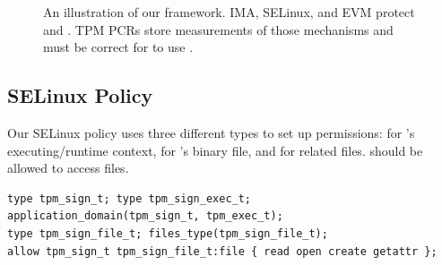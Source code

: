 \documentclass[12pt,letterpaper]{kuthesis}
\newif\ifacm
\begin{document}
\begin{figure}
  \centering
  
  \caption[Illustration of our framework]{An illustration of our framework.
    IMA, SELinux, and EVM protect \tpmsign and \wcp.
    TPM PCRs store measurements of those mechanisms
    and must be correct for \tpmsign to use \wcp.
  }
  \ifacm
    \Description[Illustration of framework.]{
      The image is an illustration of the components of the framework.
      The components are the TPM, its PCRs, and the signing key;
      the kernel security mechanisms: IMA, SELinux, and EVM;
      the wildcard policy; the LUKS container containing the wildcard policy;
      and the tpm_sign program that can access the wildcard policy.
      Green arrows point from IMA and SELinux to tpm_sign, indicating IMA and SELinux protect tpm_sign.
      Green arrows point from SELinux and EVM to the wildcard policy, indicating SELinux and EVM protect tpm_sign.
      A blue arrow points from all the kernel security mechanisms into the TPM PCRs, indicating the security mechanisms are measured into the PCRs.
      The LUKS container is represented by an orange wrapper around the wildcard policy.
      A blue arrow points from the PCRs to the orange LUKS container, indicating the PCRs are necessary to unlock the LUKS container to access the wildcard policy.
      A dashed blue arrow points from the PCRs to the wildcard policy, indicating the PCRs must still be in an approved state when using the wildcard policy to access the key.
      A double red arrow points from the wildcard policy to the key, going through tpm_sign, indicating that the tpm_sign program uses the wildcard policy as the authorization value to access the key.
    }
  \fi
  \label{fig:framework}
\end{figure}

\subsection{SELinux Policy}\label{sec:implementation-selinux}

Our SELinux policy uses three different types to set up permissions:
\domaint for \tpmsign's executing/runtime context, \exect for \tpmsign's binary file, and \filet for related files.
\domaint should be allowed to access \filet files.
\begin{lstlisting}[style=selinux-policy]
type tpm_sign_t; type tpm_sign_exec_t;
application_domain(tpm_sign_t, tpm_exec_t);
type tpm_sign_file_t; files_type(tpm_sign_file_t);
allow tpm_sign_t tpm_sign_file_t:file { read open create getattr };
\end{lstlisting}
\end{document}
